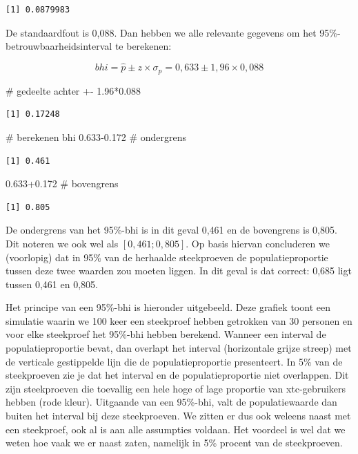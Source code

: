 \documentclass[
  letterpaper,
  DIV=11,
  numbers=noendperiod]{scrreprt}
\newenvironment{Shaded}{\begin{snugshade}}{\end{snugshade}}
\newcommand{\CommentTok}[1]{\textcolor[rgb]{0.37,0.37,0.37}{#1}}
\newcommand{\FloatTok}[1]{\textcolor[rgb]{0.68,0.00,0.00}{#1}}
\newcommand{\SpecialCharTok}[1]{\textcolor[rgb]{0.37,0.37,0.37}{#1}}
\begin{document}
\begin{verbatim}
[1] 0.0879983
\end{verbatim}

De standaardfout is 0,088. Dan hebben we alle relevante gegevens om het
95\%-betrouwbaarheidsinterval te berekenen:

\[
bhi = \hat{p} \pm z\times\sigma_{\hat{p}} = 0,633 \pm 1,96\times0,088
\]

\begin{Shaded}
\begin{Highlighting}[]
\CommentTok{\# gedeelte achter +{-}}
\FloatTok{1.96}\SpecialCharTok{*}\FloatTok{0.088}
\end{Highlighting}
\end{Shaded}

\begin{verbatim}
[1] 0.17248
\end{verbatim}

\begin{Shaded}
\begin{Highlighting}[]
\CommentTok{\# berekenen bhi}
\FloatTok{0.633{-}0.172} \CommentTok{\# ondergrens}
\end{Highlighting}
\end{Shaded}

\begin{verbatim}
[1] 0.461
\end{verbatim}

\begin{Shaded}
\begin{Highlighting}[]
\FloatTok{0.633+0.172} \CommentTok{\# bovengrens}
\end{Highlighting}
\end{Shaded}

\begin{verbatim}
[1] 0.805
\end{verbatim}

De ondergrens van het 95\%-bhi is in dit geval 0,461 en de bovengrens is
0,805. Dit noteren we ook wel als \([0,461; 0,805]\). Op basis hiervan
concluderen we (voorlopig) dat in 95\% van de herhaalde steekproeven de
populatieproportie tussen deze twee waarden zou moeten liggen. In dit
geval is dat correct: 0,685 ligt tussen 0,461 en 0,805.

Het principe van een 95\%-bhi is hieronder uitgebeeld. Deze grafiek
toont een simulatie waarin we 100 keer een steekproef hebben getrokken
van 30 personen en voor elke steekproef het 95\%-bhi hebben berekend.
Wanneer een interval de populatieproportie bevat, dan overlapt het
interval (horizontale grijze streep) met de verticale gestippelde lijn
die de populatieproportie presenteert. In 5\% van de steekproeven zie je
dat het interval en de populatieproportie niet overlappen. Dit zijn
steekproeven die toevallig een hele hoge of lage proportie van
xtc-gebruikers hebben (rode kleur). Uitgaande van een 95\%-bhi, valt de
populatiewaarde dan buiten het interval bij deze steekproeven. We zitten
er dus ook weleens naast met een steekproef, ook al is aan alle
assumpties voldaan. Het voordeel is wel dat we weten hoe vaak we er
naast zaten, namelijk in 5\% procent van de steekproeven.
\end{document}
